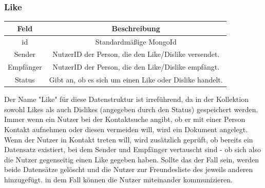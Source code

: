 \subsubsection{Like}
\begin{center}
    \begin{tabular}{ |c|c| }
        \hline
        Feld & Beschreibung  \\
        \hline
        id & Standardmäßige MongoId \\
        Sender & NutzerID der Person, die den Like/Dislike versendet. \\
        Empfänger &  NutzerID der Person, die den Like/Dislike empfängt. \\
        Status & Gibt an, ob es sich um einen Like oder Dislike handelt. \\
        \hline
    \end{tabular}
    \cite{DB3} \cite{DB4}
\end{center}

Der Name "Like" für diese Datenstruktur ist irreführend, da in der Kollektion sowohl Likes als auch Dislikes (angegeben durch den Status) gespeichert werden.
Immer wenn ein Nutzer bei der Kontaktsuche angibt, ob er mit einer Person Kontakt aufnehmen oder diesen vermeiden will, wird ein Dokument angelegt. Wenn der Nutzer in Kontakt treten will, wird zusätzlich geprüft, ob bereits ein Datensatz existiert, bei dem Sender und Empfänger vertauscht sind - ob sich also die Nutzer gegenseitig einen Like gegeben haben. Sollte das der Fall sein, werden beide Datensätze gelöscht und die Nutzer zur Freundesliste des jeweils anderen hinzugefügt. in dem Fall können die Nutzer miteinander kommunizieren.

